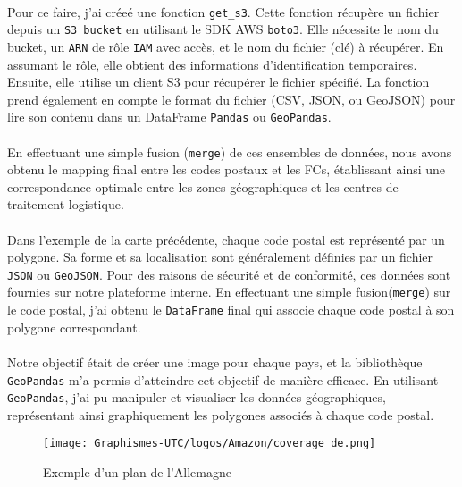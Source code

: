 \paragraph{}
\vspace{-2em}
Pour ce faire, j'ai créeé une fonction \texttt{get\_s3}. Cette fonction récupère un fichier depuis un \texttt{S3 bucket} en utilisant le SDK AWS \texttt{boto3}. Elle nécessite le nom du {bucket}, un \texttt{ARN} de rôle \texttt{IAM} avec accès, et le nom du fichier (clé) à récupérer. En assumant le rôle, elle obtient des informations d'identification temporaires. Ensuite, elle utilise un client S3 pour récupérer le fichier spécifié. La fonction prend également en compte le format du fichier (CSV, JSON, ou GeoJSON) pour lire son contenu dans un DataFrame \texttt{Pandas} ou \texttt{GeoPandas}. 

\paragraph{}
\vspace{-2em}
En effectuant une simple fusion (\texttt{merge}) de ces ensembles de données, nous avons obtenu le mapping final entre les codes postaux et les FCs, établissant ainsi une correspondance optimale entre les zones géographiques et les centres de traitement logistique. 
\paragraph{}
\vspace{-2em}
Dans l'exemple de la carte précédente, chaque code postal est représenté par un polygone. Sa forme et sa localisation sont généralement définies par un fichier \texttt{JSON} ou \texttt{GeoJSON}. Pour des raisons de sécurité et de conformité, ces données sont fournies sur notre plateforme interne. En effectuant une simple fusion(\texttt{merge}) sur le code postal, j'ai obtenu le \texttt{DataFrame} final qui associe chaque code postal à son polygone correspondant.

\paragraph{}
\vspace{-2em}
Notre objectif était de créer une image pour chaque pays, et la bibliothèque \texttt{GeoPandas} m'a permis d'atteindre cet objectif de manière efficace. En utilisant \texttt{GeoPandas}, j'ai pu manipuler et visualiser les données géographiques, représentant ainsi graphiquement les polygones associés à chaque code postal. 
    \begin{figure}[H]
    \centering
    \texttt{[image: Graphismes-UTC/logos/Amazon/coverage\_de.png]}
    \caption{Exemple d'un plan de l'Allemagne}
    \end{figure}

